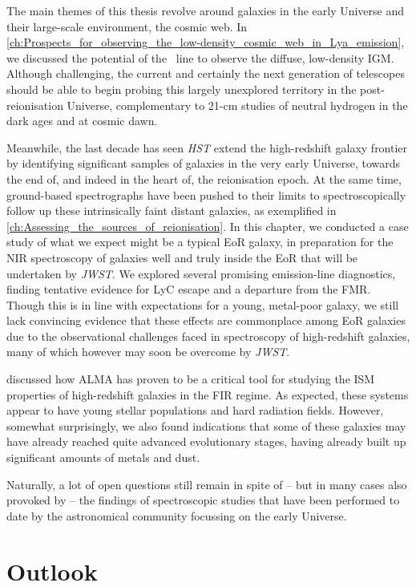The main themes of this thesis revolve around galaxies in the early Universe and their large-scale environment, the cosmic web. In \cref{ch:Prospects_for_observing_the_low-density_cosmic_web_in_Lya_emission}, we discussed the potential of the \lya\ line to observe the diffuse, low-density IGM. Although challenging, the current and certainly the next generation of telescopes should be able to begin probing this largely unexplored territory in the post-reionisation Universe, complementary to 21-cm studies of neutral hydrogen in the dark ages and at cosmic dawn.

Meanwhile, the last decade has seen \textit{HST} extend the high-redshift galaxy frontier by identifying significant samples of galaxies in the very early Universe, towards the end of, and indeed in the heart of, the reionisation epoch. At the same time, ground-based spectrographs have been pushed to their limits to spectroscopically follow up these intrinsically faint distant galaxies, as exemplified in \cref{ch:Assessing_the_sources_of_reionisation}. In this chapter, we conducted a case study of what we expect might be a typical EoR galaxy, in preparation for the NIR spectroscopy of galaxies well and truly inside the EoR that will be undertaken by \textit{JWST}. We explored several promising emission-line diagnostics, finding tentative evidence for LyC escape and a departure from the FMR. Though this is in line with expectations for a young, metal-poor galaxy, we still lack convincing evidence that these effects are commonplace among EoR galaxies due to the observational challenges faced in spectroscopy of high-redshift galaxies, many of which however may soon be overcome by \textit{JWST}.

 discussed how ALMA has proven to be a critical tool for studying the ISM properties of high-redshift galaxies in the FIR regime. As expected, these systems appear to have young stellar populations and hard radiation fields. However, somewhat surprisingly, we also found indications that some of these galaxies may have already reached quite advanced evolutionary stages, having already built up significant amounts of metals and dust.

Naturally, a lot of open questions still remain in spite of -- but in many cases also provoked by -- the findings of spectroscopic studies that have been performed to date by the astronomical community focussing on the early Universe.

\section{Outlook}

